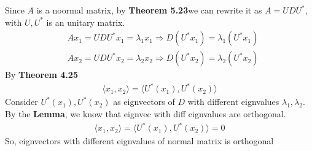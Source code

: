 \documentclass{article}
\begin{document}
Since $A$ is a noormal matrix, by \textbf{Theorem 5.23}we can rewrite it as $A = UDU^*$, with $U, U^*$ is an unitary matrix.
\begin{equation*}
    \begin{split}
       & Ax_1 = UDU^*x_1 = \lambda_1 x_1 \Rightarrow D(U^*x_1) = \lambda_1(U^*x_1) \\
        & Ax_2 = UDU^*x_2 = \lambda_2 x_2 \Rightarrow D(U^*x_2) = \lambda_2(U^*x_2)
    \end{split}
\end{equation*}
By \textbf{Theorem 4.25}
\begin{equation*}
    \begin{split}
        \langle x_1, x_2 \rangle = \langle U^*(x_1), U^*(x_2) \rangle
    \end{split}
\end{equation*}
Consider $U^*(x_1), U^*(x_2)$ as eignvectors of $D$ with different eignvalues $\lambda_1, \lambda_2$. 
By the \textbf{Lemma}, we know that eignvec with diff eignvalues are orthogonal.
\begin{equation*}
    \begin{split}
        \langle x_1, x_2 \rangle = \langle U^*(x_1), U^*(x_2) \rangle = 0
    \end{split}
\end{equation*} 
So, eignvectors with different eignvalues of normal matrix is orthogonal
\end{document}
